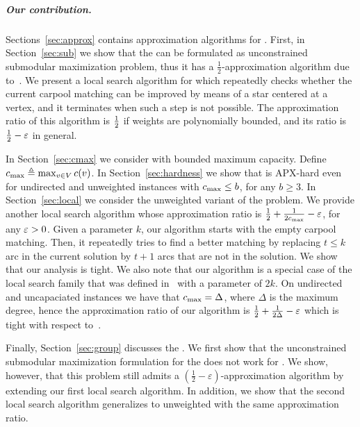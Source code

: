 
\subparagraph{Our contribution.}
%
Sections~\ref{sec:approx} contains approximation algorithms
for \carpool.  First, in Section~\ref{sec:sub} we show that
the \carpool can be formulated as unconstrained submodular
maximization problem, thus it has a $\frac{1}{2}$-approximation
algorithm due to~\cite{BFNS15,buchbinder2016deterministic}.
%
We present a local search algorithm for \carpool which repeatedly
checks whether the current carpool matching can be improved by means
of a star centered at a vertex, and it terminates when such a step is
not possible.
%
The approximation ratio of this algorithm is $\frac{1}{2}$ if weights are
polynomially bounded, and its ratio is $\frac{1}{2}-\varepsilon$ in general.

In Section~\ref{sec:cmax} we consider \carpool with bounded maximum
capacity.   Define $c_{\max} \triangleq \max_{v \in V} c(v)$.
%
In Section~\ref{sec:hardness} we show that \carpool is APX-hard even
for undirected and unweighted instances with $c_{\max} \leq b$, for any
$b \geq 3$.
%
In Section~\ref{sec:local} we consider the unweighted variant of the
problem.  We provide another local search algorithm whose
approximation ratio is $\frac{1}{2} + \frac{1}{2c_{\max}} - \varepsilon$, for any
$\varepsilon>0$.  Given a parameter $k$, our algorithm starts with the empty
carpool matching.  Then, it repeatedly tries to find a better matching
by replacing $t \leq k$ arc in the current solution by $t+1$ arcs that
are not in the solution.
%
We show that our analysis is tight.  We also note that our algorithm
is a special case of the local search family that was defined
in~\cite{ACKK09} with a parameter of $2k$.  On undirected and
uncapaciated instances we have that $c_{\max} = \Delta$, where $\Delta$
is the maximum degree, hence the approximation ratio of our algorithm
is $\frac{1}{2} + \frac{1}{2\Delta} - \varepsilon$ which is tight with respect
to~\cite{ACKK09}.

Finally, Section~\ref{sec:group} discusses the \gcp.  We first show
that the unconstrained submodular maximization formulation for
the \carpool does not work for \gcp.  We show, however, that this
problem still admits a $(\frac{1}{2} -\varepsilon)$-approximation
algorithm by extending our first local search algorithm.  In
addition, we show that the second local search algorithm generalizes
to unweighted \gcp with the same approximation ratio.

